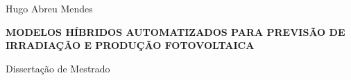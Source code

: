 \begin{titlepage}
\begin{center}
{\Large Hugo Abreu Mendes}

\vspace{1.3in}

{\Large \textbf{MODELOS HÍBRIDOS AUTOMATIZADOS PARA PREVISÃO DE IRRADIAÇÃO E PRODUÇÃO FOTOVOLTAICA}} \\

\vspace{1.4in}

{\large Dissertação de Mestrado}


\vspace{1.6in}


\vspace{18pt}{Recife, Março de 2021.}

\end{center}
\end{titlepage} 